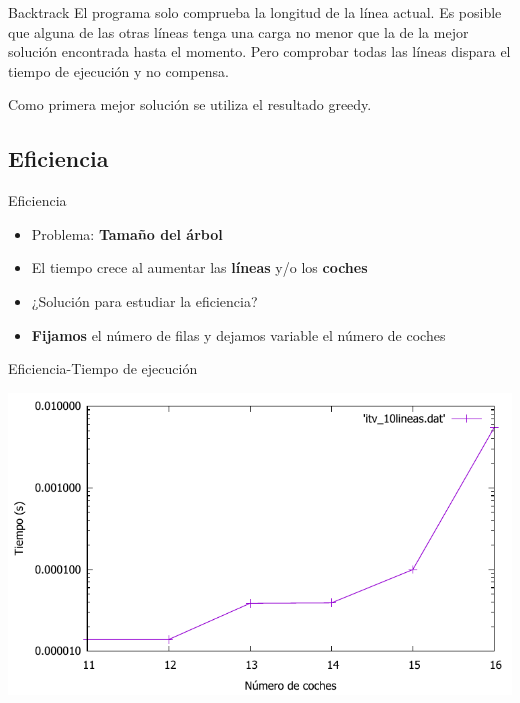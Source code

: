 \begin{frame}{Backtrack}
	El programa solo comprueba la longitud de la línea actual. Es posible que alguna de las otras líneas tenga una carga no menor que la de la mejor solución encontrada hasta el momento. Pero comprobar todas las líneas dispara el tiempo de ejecución y no compensa.
	
	\pause
	
	Como primera mejor solución se utiliza el resultado greedy.
\end{frame}

\subsection{Eficiencia}

\begin{frame}{Eficiencia}
	\begin{itemize}
		\item Problema: \textbf{Tamaño del árbol}
		\pause
		\item El tiempo crece al aumentar las \textbf{líneas} y/o los \textbf{coches}
		\pause
		\item ¿Solución para estudiar la eficiencia?
		\pause
		\item \textbf{Fijamos} el número de filas y dejamos variable el número de coches
	\end{itemize}
\end{frame}

\begin{frame}{Eficiencia-Tiempo de ejecución}
	\begin{center}
		\includegraphics[width = \linewidth]{img/itvEficiencia}
	\end{center}
\end{frame}

